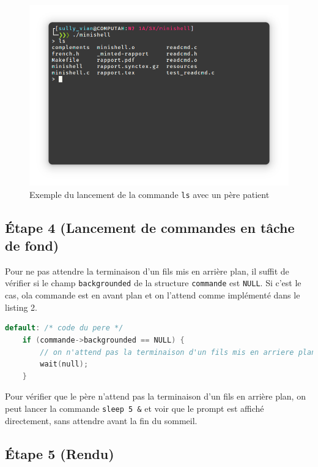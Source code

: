 \documentclass{article}
\begin{document}
\begin{figure}[H]
    \centering
    \includegraphics[width=1\textwidth]{./resources/E3.png}
    \caption{Exemple du lancement de la commande \texttt{ls} avec un père patient}
\end{figure}

\subsection*{Étape 4 (Lancement de commandes en tâche de fond)}

Pour ne pas attendre la terminaison d'un fils mis en arrière plan, il suffit de vérifier si le champ \texttt{backgrounded} de la structure \texttt{commande} est \texttt{NULL}. Si c'est le cas, ola commande est en avant plan et on l'attend comme implémenté dans le listing 2.

\begin{lstlisting}[language=C, caption=Ajout pour la question 4]
default: /* code du pere */
    if (commande->backgrounded == NULL) {
        // on n'attend pas la terminaison d'un fils mis en arriere plan
        wait(null);
    }
\end{lstlisting}

Pour vérifier que le père n'attend pas la terminaison d'un fils en arrière plan, on peut lancer la commande \texttt{sleep 5 \&} et voir que le prompt est affiché directement, sans attendre avant la fin du sommeil.

\subsection*{Étape 5 (Rendu)}
\end{document}
